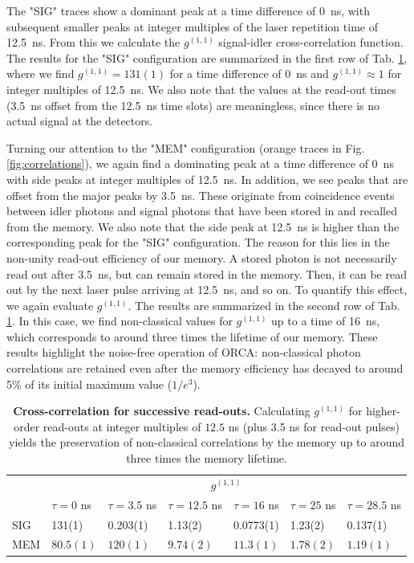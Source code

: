 The "SIG" traces show a dominant peak at a time difference of 0~ns, with subsequent smaller peaks at integer multiples of the laser repetition time of 12.5~ns. From this we calculate the $g^{(1,1)}$ signal-idler cross-correlation function. The results for the "SIG" configuration are summarized in the first row of Tab. \ref{tab:g11}, where we find $g^{(1,1)}=131(1)$ for a time difference of 0~ns and $g^{(1,1)}\approx1$ for integer multiples of 12.5~ns. We also note that the values at the read-out times (3.5~ns offset from the 12.5~ns time slots) are meaningless, since there is no actual signal at the detectors. 

Turning our attention to the "MEM" configuration (orange traces in Fig. \ref{fig:correlations}), we again find a dominating peak at a time difference of 0~ns with side peaks at integer multiples of 12.5~ns. In addition, we see peaks that are offset from the major peaks by 3.5~ns. These originate from coincidence events between idler photons and signal photons that have been stored in and recalled from the memory. We also note that the side peak at 12.5~ns is higher than the corresponding peak for the "SIG" configuration. The reason for this lies in the non-unity read-out efficiency of our memory. A stored photon is not necessarily read out after 3.5~ns, but can remain stored in the memory. Then, it can be read out by the next laser pulse arriving at 12.5~ns, and so on. To quantify this effect, we again evaluate $g^{(1,1)}$. The results are summarized in the second row of Tab. \ref{tab:g11}. In this case, we find non-classical values for $g^{(1,1)}$ up to a time of 16~ns, which corresponds to around three times the lifetime of our memory. These results highlight the noise-free operation of ORCA: non-classical photon correlations are retained even after the memory efficiency has decayed to around 5\% of its initial maximum value ($1/e^3$).

\begin{table}
\centering
\begin{tabular}{|l||l|l|l|l|l|l|}
\hline
\multirow{2}{*}{}   & \multicolumn{6}{c|}{$g^{(1,1)}$} \\
    & $\tau=0$ ns & $\tau=3.5$ ns & $\tau=12.5$ ns & $\tau=16$ ns & $\tau=25$ ns & $\tau=28.5$ ns \\
\hline\hline
SIG & 131(1) & 0.203(1) & 1.13(2) & 0.0773(1) & 1.23(2) & 0.137(1) \\
\hline
MEM & $80.5(1)$ & $120(1)$ & $9.74(2)$ & $11.3(1)$ & $1.78(2)$ & $1.19(1)$ \\
\hline
\end{tabular}
\caption{\textbf{Cross-correlation for successive read-outs.} Calculating $g^{(1,1)}$ for higher-order read-outs at integer multiples of $12.5$ ns (plus 3.5 ns for read-out pulses) yields the preservation of non-classical correlations by the memory up to around three times the memory lifetime.}
\label{tab:g11}
\end{table}